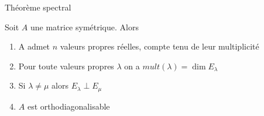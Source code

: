         \begin{parag}{Théorème spectral}
            \begin{theoreme}
                Soit $A$ une matrice symétrique. Alors
                \begin{enumerate}
                    \item A admet $n$ valeurs propres réelles, compte tenu de leur multiplicité
                    \item Pour toute valeurs propres $\lambda$ on a $mult(\lambda) = \dim E_\lambda$
                    \item Si $\lambda \neq \mu$ alors $E_\lambda \perp E_\mu$
                    \item $A$ est orthodiagonalisable
                \end{enumerate}
            \end{theoreme}
        \end{parag}